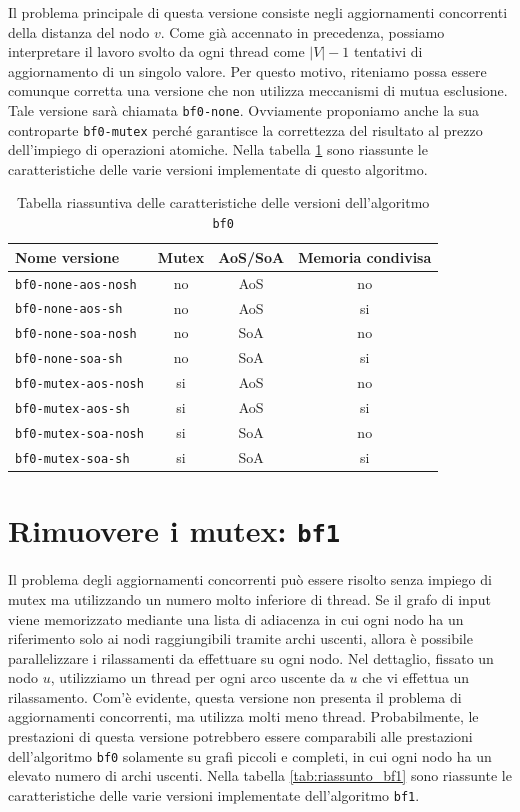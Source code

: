 \documentclass[12pt,a4paper,oneside]{book}
\begin{document}
	Il problema principale di questa versione consiste negli aggiornamenti concorrenti della distanza del nodo $v$. Come già accennato in precedenza, possiamo interpretare il lavoro svolto da ogni thread come $|V|-1$ tentativi di aggiornamento di un singolo valore. Per questo motivo, riteniamo possa essere comunque corretta una versione che non utilizza meccanismi di mutua esclusione. Tale versione sarà chiamata \texttt{bf0-none}. Ovviamente proponiamo anche la sua controparte \texttt{bf0-mutex} perché garantisce la correttezza del risultato al prezzo dell'impiego di operazioni atomiche. Nella tabella \ref{tab:riassunto_bf0} sono riassunte le caratteristiche delle varie versioni implementate di questo algoritmo.
	
	\begin{table}[!ht]
		\centering
		\begin{tabular}{|l|c|c|c|}
			\hline
			\textbf{Nome versione} & \textbf{Mutex} & \textbf{AoS/SoA} & \textbf{Memoria condivisa} \\ \hline
			\texttt{bf0-none-aos-nosh}  & no & AoS & no \\ \hline
			\texttt{bf0-none-aos-sh}    & no & AoS & si \\ \hline
			\texttt{bf0-none-soa-nosh}  & no & SoA & no \\ \hline
			\texttt{bf0-none-soa-sh}    & no & SoA & si \\ \hline
			\texttt{bf0-mutex-aos-nosh} & si & AoS & no \\ \hline
			\texttt{bf0-mutex-aos-sh}   & si & AoS & si \\ \hline
			\texttt{bf0-mutex-soa-nosh} & si & SoA & no \\ \hline
			\texttt{bf0-mutex-soa-sh}   & si & SoA & si \\ \hline
		\end{tabular}
		\caption{Tabella riassuntiva delle caratteristiche delle versioni dell'algoritmo \texttt{bf0}}
		\label{tab:riassunto_bf0}
	\end{table}
	
	\section{Rimuovere i mutex: \texttt{bf1}}
	\label{section:intro-bf1}
	Il problema degli aggiornamenti concorrenti può essere risolto senza impiego di mutex ma utilizzando un numero molto inferiore di thread. Se il grafo di input viene memorizzato mediante una lista di adiacenza in cui ogni nodo ha un riferimento solo ai nodi raggiungibili tramite archi uscenti, allora è possibile parallelizzare i rilassamenti da effettuare su ogni nodo. Nel dettaglio, fissato un nodo $u$, utilizziamo un thread per ogni arco uscente da $u$ che vi effettua un rilassamento. Com'è evidente, questa versione non presenta il problema di aggiornamenti concorrenti, ma utilizza molti meno thread. Probabilmente, le prestazioni di questa versione potrebbero essere comparabili alle prestazioni dell'algoritmo \texttt{bf0} solamente su grafi piccoli e completi, in cui ogni nodo ha un elevato numero di archi uscenti. Nella tabella \ref{tab:riassunto_bf1} sono riassunte le caratteristiche delle varie versioni implementate dell'algoritmo \texttt{bf1}.
	
\end{document}
